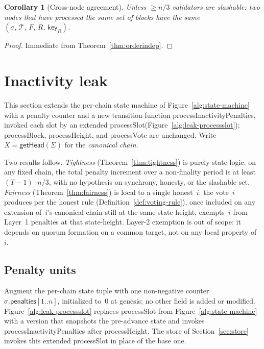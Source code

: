 \documentclass{article}
\newcommand{\T}[0]{\ensuremath{\mathcal{T}}}
\newcommand{\penalties}{\mathsf{penalties}}
\newcommand{\key}{\mathsf{key}}
\newcommand{\processSlot}{\textsf{processSlot}\xspace}
\newcommand{\processBlock}{\textsf{processBlock}\xspace}
\newcommand{\processHeight}{\textsf{processHeight}\xspace}
\newcommand{\processVote}{\textsf{processVote}\xspace}
\newcommand{\processInactivityPenalties}{\textsf{processInactivityPenalties}\xspace}
\newcommand{\getHead}{\textsf{getHead}\xspace}
\theoremstyle{plain}
\newtheorem{corollary}{Corollary}
\theoremstyle{definition}
\theoremstyle{remark}
\begin{document}
\begin{corollary}[Cross-node agreement]\label{cor:agreement}
Unless $\geq n/3$ validators are slashable: two nodes that have processed the same set of blocks have the same $(\sigma,\, \T,\, F,\, R,\, \key_R)$.
\end{corollary}

\begin{proof}
Immediate from Theorem~\ref{thm:orderindep}.
\end{proof}

\section{Inactivity leak}

This section extends the per-chain state machine of Figure~\ref{alg:state-machine} with a penalty counter and a new transition function \processInactivityPenalties, invoked each slot by an extended \processSlot (Figure~\ref{alg:leak-processslot}); \processBlock, \processHeight, and \processVote are unchanged.
Write $X = \getHead(\Sigma)$ for the \emph{canonical chain}.

Two results follow.
\emph{Tightness} (Theorem~\ref{thm:tightness}) is purely state-logic: on any fixed chain, the total penalty increment over a non-finality period is at least $(T-1) \cdot n/3$, with no hypothesis on synchrony, honesty, or the slashable set.
\emph{Fairness} (Theorem~\ref{thm:fairness}) is local to a single honest~$i$: the vote~$i$ produces per the honest rule (Definition~\ref{def:voting-rule}), once included on any extension of~$i$'s canonical chain still at the same state-height, exempts~$i$ from Layer~1 penalties at that state-height.
Layer-2 exemption is out of scope: it depends on quorum formation on a common target, not on any local property of~$i$.

\subsection{Penalty units}

Augment the per-chain state tuple with one non-negative counter $\sigma.\penalties[1..n]$, initialized to~$0$ at genesis; no other field is added or modified.
Figure~\ref{alg:leak-processslot} replaces \processSlot from Figure~\ref{alg:state-machine} with a version that snapshots the pre-advance state and invokes \processInactivityPenalties after \processHeight.
The store of Section~\ref{sec:store} invokes this extended \processSlot in place of the base one.
\end{document}
